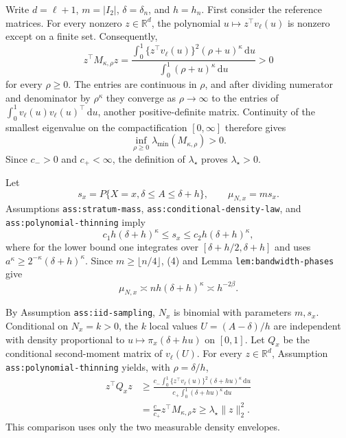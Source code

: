 Write \(d=\ell+1\), \(m=|I_2|\), \(\delta=\delta_n\), and \(h=h_n\).  First consider the reference matrices.  For every nonzero \(z\in\mathbb R^d\), the polynomial \(u\mapsto z^\top v_\ell(u)\) is nonzero except on a finite set.  Consequently,
\[
 z^\top M_{\kappa,\rho}z
 =\frac{\int_0^1\{z^\top v_\ell(u)\}^2(\rho+u)^\kappa\,\mathrm du}
        {\int_0^1(\rho+u)^\kappa\,\mathrm du}>0
\]
for every \(\rho\geq0\).  The entries are continuous in \(\rho\), and after dividing numerator and denominator by \(\rho^\kappa\) they converge as \(\rho\to\infty\) to the entries of \(\int_0^1v_\ell(u)v_\ell(u)^\top\,\mathrm du\), another positive-definite matrix.  Continuity of the smallest eigenvalue on the compactification \([0,\infty]\) therefore gives
\[
 \inf_{\rho\geq0}\lambda_{\min}(M_{\kappa,\rho})>0.
\]
Since \(c_->0\) and \(c_+<\infty\), the definition of \(\lambda_\star\) proves \(\lambda_\star>0\).

Let
\[
 s_x=P\{X=x,\delta\leq A\leq\delta+h\},
 \qquad \mu_{N,x}=ms_x.
\]
Assumptions \texttt{ass:stratum-mass}, \texttt{ass:conditional-density-law}, and \texttt{ass:polynomial-thinning} imply
\[
 c_1h(\delta+h)^\kappa\leq s_x\leq c_2h(\delta+h)^\kappa, \tag{4}
\]
where for the lower bound one integrates over \([\delta+h/2,\delta+h]\) and uses \(a^\kappa\geq2^{-\kappa}(\delta+h)^\kappa\).  Since \(m\geq\lfloor n/4\rfloor\), (4) and Lemma \texttt{lem:bandwidth-phases} give
\[
 \mu_{N,x}\asymp nh(\delta+h)^\kappa\asymp h^{-2\beta}. \tag{5}
\]

By Assumption \texttt{ass:iid-sampling}, \(N_x\) is binomial with parameters \(m,s_x\).  Conditional on \(N_x=k>0\), the \(k\) local values \(U=(A-\delta)/h\) are independent with density proportional to \(u\mapsto\pi_x(\delta+hu)\) on \([0,1]\).  Let \(Q_x\) be the conditional second-moment matrix of \(v_\ell(U)\).  For every \(z\in\mathbb R^d\), Assumption \texttt{ass:polynomial-thinning} yields, with \(\rho=\delta/h\),
\[
 \begin{aligned}
 z^\top Q_xz
 &\geq\frac{c_-\int_0^1\{z^\top v_\ell(u)\}^2(\delta+hu)^\kappa\,\mathrm du}
              {c_+\int_0^1(\delta+hu)^\kappa\,\mathrm du}\\
 &=\frac{c_-}{c_+}z^\top M_{\kappa,\rho}z
 \geq\lambda_\star\lVert z\rVert_2^2.
 \end{aligned} \tag{6}
\]
This comparison uses only the two measurable density envelopes.

